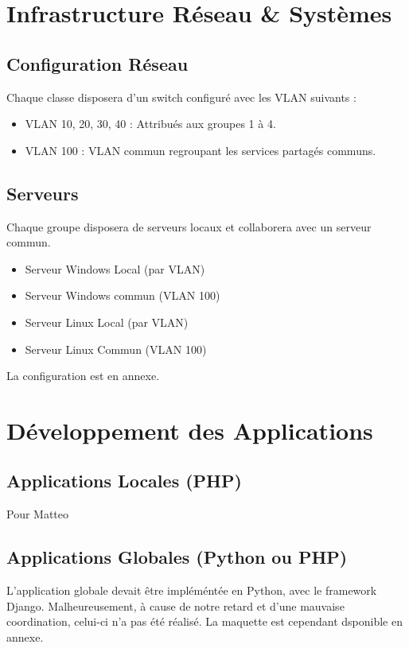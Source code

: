 \documentclass[a4paper,12pt]{report}
\begin{document}
\chapter{Infrastructure Réseau \& Systèmes}
\section{Configuration Réseau}
Chaque classe disposera d'un switch configuré avec les VLAN suivants :
\begin{itemize}
    \item VLAN 10, 20, 30, 40 : Attribués aux groupes 1 à 4.
    \item VLAN 100 : VLAN commun regroupant les services partagés communs.
\end{itemize}

\section{Serveurs}
Chaque groupe disposera de serveurs locaux et collaborera avec un serveur commun.
\begin{itemize}
    \item Serveur Windows Local (par VLAN)
    \item Serveur Windows commun (VLAN 100)
    \item Serveur Linux Local (par VLAN)
    \item Serveur Linux Commun (VLAN 100)
\end{itemize}

La configuration est en annexe.

\chapter{Développement des Applications}
\section{Applications Locales (PHP)}

Pour Matteo

\section{Applications Globales (Python ou PHP)}

L'application globale devait être impléméntée en Python, avec le framework Django. Malheureusement, à cause de notre retard et d'une mauvaise coordination, celui-ci n'a pas été réalisé. La maquette est cependant dsponible en annexe.
\end{document}

